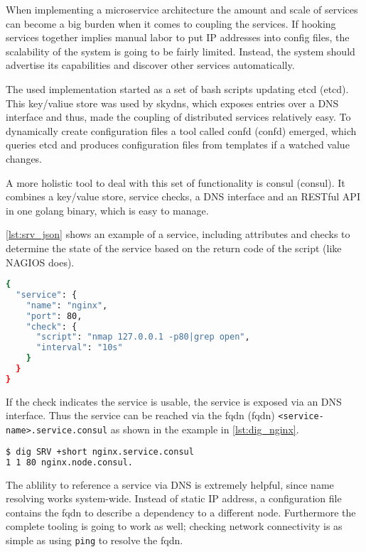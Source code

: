 When implementing a microservice architecture the amount and scale of services can become a big burden when it comes to coupling the services.
If hooking services together implies manual labor to put IP addresses into config files, the scalability of the system is going to be fairly limited.
Instead, the system should advertise its capabilities and discover other services automatically.

The used implementation started as a set of bash scripts updating \gls{etcd} (\glsdesc{etcd}).
This key/valiue store was used by \gls{skydns}, which exposes entries
over a DNS interface and thus, made the coupling of distributed services relatively easy. To dynamically create configuration files a tool called
\gls{confd} (\glsdesc{confd}) emerged, which queries \gls{etcd} and produces configuration files from templates if a watched value changes.

A more holistic tool to deal with this set of functionality is \gls{consul} (\glsdesc{consul}). It combines a key/value store, service checks,
a DNS interface and an RESTful API in one golang binary, which is easy to manage.

\autoref{lst:srv_json} shows an example of a service, including attributes and checks to determine the state of the service based on the return code of the script (like NAGIOS does). 

\begin{lstlisting}[language=bash,
    caption={Service definition within \gls{consul}. If the keyword \texttt{open} is not found within the nmap output the service is set into a warning state},
    label={lst:srv_json}]
{
  "service": {
    "name": "nginx",
    "port": 80,
    "check": {
      "script": "nmap 127.0.0.1 -p80|grep open",
      "interval": "10s"
    }
  }
}
\end{lstlisting}

If the check indicates the service is usable, the service is exposed via an DNS interface.
Thus the service can be reached via the \gls{fqdn} (\glsdesc{fqdn}) \lstinline{<service-name>.service.consul}
as shown in the example in \autoref{lst:dig_nginx}.
\begin{lstlisting}[language=bash,
    caption={DNS query of \lstinline{nginx} service, issued with \texttt{dig}, a common DNS resolver},
    label={lst:dig_nginx}]
$ dig SRV +short nginx.service.consul
1 1 80 nginx.node.consul.
\end{lstlisting}

The ablility to reference a service via DNS is extremely helpful, since name resolving works system-wide. Instead of static IP address,
a configuration file contains the \gls{fqdn} to describe a dependency to a different node. Furthermore the complete tooling
is going to work as well; checking network connectivity is as simple as using \lstinline{ping} to resolve the \gls{fqdn}.

